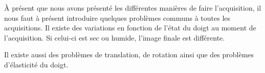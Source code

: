 À présent que nous avons présenté les différentes manières de faire
l'acquisition, il nous faut à présent introduire quelques problèmes
communs à toutes les acquisitions. Il existe des variations en
fonction de l'état du doigt au moment de l'acquisition. Si celui-ci
est sec ou humide, l'image finale est différente.

Il existe aussi des problèmes de translation, de rotation ainsi que
des problèmes d'élasticité du doigt.



